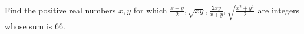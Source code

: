 Find the positive real numbers $x,y$ for which $\frac{x+y}{2},\sqrt{xy},\frac{2xy}{x+y},\sqrt{\frac{x^2 +y^2}{2}}$ are integers whose sum is $66$.